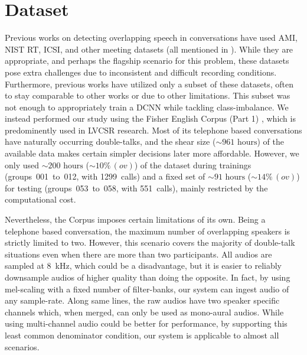 \documentclass[a4paper]{article}
\begin{document}
\section{Dataset} \label{sec:dataset}
Previous works on detecting overlapping speech in conversations have used AMI, NIST RT, ICSI,
and other meeting datasets (all mentioned in \cite{cetin_speaker_2006}).
While they are appropriate, and perhaps the flagship scenario for this problem,
these datasets pose extra challenges due to inconsistent and difficult recording conditions.
Furthermore, previous works have utilized only a subset of these datasets,
often to stay comparable to other works or due to other limitations.
This subset was not enough to appropriately train a DCNN while tackling class-imbalance.
We instead performed our study using the Fisher English Corpus (Part 1) \cite{cieri_switchboard_2003},
which is predominently used in LVCSR research.
Most of its telephone based conversations have naturally occurring double-talks,
and the shear size ($\sim \! \text{961~hours}$) of the available data makes certain simpler decisions later more affordable.
However, we only used $\sim \! \text{200~hours}$
($\sim \! \text{10\%}\,(ov)$) of the dataset during trainings
(groups~001~to~012, with 1299~calls) and a fixed set of
$\sim \! \text{91~hours}$ ($\sim \! \text{14\%}\,(ov)$) for testing
(groups~053~to~058, with 551~calls),
mainly restricted by the computational cost.

Nevertheless, the Corpus imposes certain limitations of its own.
Being a telephone based conversation,
the maximum number of overlapping speakers is strictly limited to two.
However, this scenario covers the majority of double-talk situations even when there are more than two participants.
All audios are sampled at 8~kHz, which could be a disadvantage,
but it is easier to reliably downsample audios of higher quality than doing the opposite.
In fact, by using mel-scaling with a fixed number of filter-banks,
our system can ingest audio of any sample-rate.
Along same lines,
the raw audios have two speaker specific channels which, when merged,
can only be used as mono-aural audios.
While using multi-channel audio could be better for performance,
by supporting this least common denominator condition,
our system is applicable to almost all scenarios.
\end{document}
